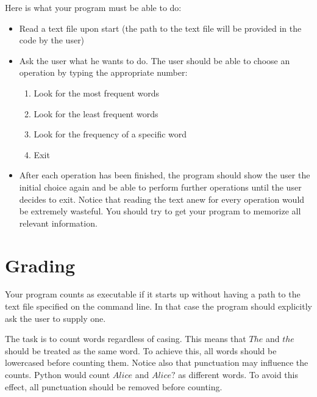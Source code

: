 \documentclass[11pt, leqno, a4paper]{article}
\begin{document}
Here is what your program must be able to do:
\begin{itemize}
\item Read a text file upon start (the path to the text file will be provided in the code by the user)
\item Ask the user what he wants to do. The user should be able to choose an operation by typing the appropriate number:
\begin{enumerate}
\item Look for the most frequent words
\item Look for the least frequent words
\item Look for the frequency of a specific word
\item Exit
\end{enumerate}
\item After each operation has been finished, the program should show the user the initial choice again and be able to perform further operations until the
user decides to exit. Notice that reading the text anew for every operation would be extremely wasteful. You should try to get your program to memorize all
relevant information.
\end{itemize}

\section{Grading}
Your program counts as executable if it starts up without having a path to the text file specified on the command line. In that case the program should
explicitly ask the user to supply one. 

The task is to count words regardless of casing. This means that $ The $ and $ the $ should be treated as the same word. To achieve this, all words should be lowercased before counting them. Notice also that 
punctuation may influence the counts. Python would count $ Alice $ and $ Alice? $ as different words.
To avoid this effect, all punctuation should be removed before counting.
\end{document}
